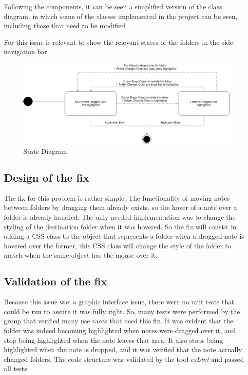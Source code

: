 Following the components, it can be seen a simplified version of the
class diagram, in which some of the classes implemented in the project
can be seen, including those that need to be modified.

For this issue is relevant to show the relevant states of the folders in
the side navigation bar.

\begin{figure}
\centering
\includegraphics[width=6.25000in]{../stateDiagram.png}
\caption{State Diagram}
\end{figure}

\subsection{Design of the fix}\label{design-of-the-fix-1}

The fix for this problem is rather simple. The functionality of moving
notes between folders by dragging them already exists, so the hover of a
note over a folder is already handled. The only needed implementation
was to change the styling of the destination folder when it was hovered.
So the fix will consist in adding a CSS class to the object that
represents a folder when a dragged note is hovered over the former, this
CSS class will change the style of the folder to match when the same
object has the mouse over it.

\subsection{Validation of the fix}\label{validation-of-the-fix}

Because this issue was a graphic interface issue, there were no unit
tests that could be run to assure it was fully right. So, many tests
were performed by the group that verified many use cases that used this
fix. It was evident that the folder was indeed becoming highlighted when
notes were dragged over it, and stop being highlighted when the note
leaves that area. It also stops being highlighted when the note is
dropped, and it was verified that the note actually changed folders. The
code structure was validated by the tool \emph{esLint} and passed all
tests.

